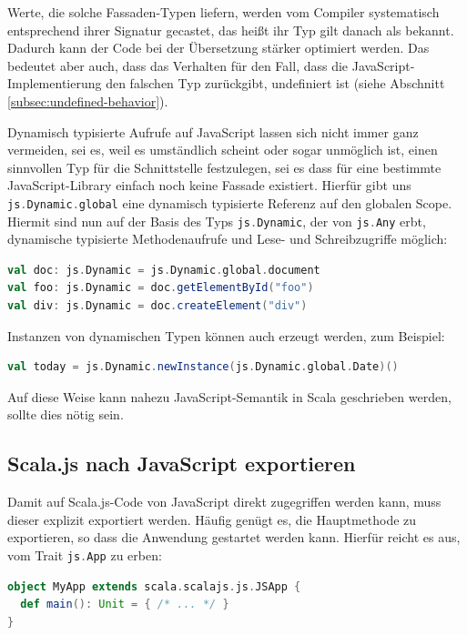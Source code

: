 \documentclass[a4paper, 12pt, hidelinks, listof=totoc, listoftables=totoc, bibliography=totoc]{scrreprt}
\newcommand{\scala}[1]{\lstinline[language=Scala, style=inline]|#1|}
\begin{document}
Werte, die solche Fassaden-Typen liefern, werden vom Compiler systematisch entsprechend ihrer Signatur gecastet, das heißt ihr Typ gilt danach als bekannt. Dadurch kann der Code bei der Übersetzung stärker optimiert werden. Das bedeutet aber auch, dass das Verhalten für den Fall, dass die JavaScript-Implementierung den falschen Typ zurückgibt, undefiniert ist
(siehe Abschnitt \ref{subsec:undefined-behavior}).\cite[Folie 40, Min. 33]{doeraene2015.SSP}

Dynamisch typisierte Aufrufe auf JavaScript lassen sich nicht immer ganz vermeiden, sei es, weil es umständlich scheint oder sogar unmöglich ist, einen sinnvollen Typ für die Schnittstelle festzulegen, sei es dass für eine bestimmte JavaScript-Library einfach noch keine Fassade existiert. Hierfür gibt uns \scala{js.Dynamic.global} eine dynamisch typisierte Referenz auf den globalen Scope. Hiermit sind nun auf der Basis des Typs \scala{js.Dynamic}, der von \scala{js.Any} erbt, dynamische typisierte Methodenaufrufe und Lese- und Schreibzugriffe möglich:

\begin{lstlisting}[language=Scala, style=snippet]
val doc: js.Dynamic = js.Dynamic.global.document
val foo: js.Dynamic = doc.getElementById("foo")
val div: js.Dynamic = doc.createElement("div")
\end{lstlisting}

Instanzen von dynamischen Typen können auch erzeugt werden, zum Beispiel:
\begin{lstlisting}[language=Scala, style=snippet]
val today = js.Dynamic.newInstance(js.Dynamic.global.Date)()
\end{lstlisting}

Auf diese Weise kann nahezu JavaScript-Semantik in Scala geschrieben werden, sollte dies nötig sein.\cite[Vgl.][]{scalajs.DCJ}

\subsection{Scala.js nach JavaScript exportieren}

Damit auf Scala.js-Code von JavaScript direkt zugegriffen werden kann, muss dieser explizit exportiert werden. Häufig genügt es, die Hauptmethode zu exportieren, so dass die Anwendung gestartet werden kann. Hierfür reicht es aus, vom Trait \scala{js.App} zu erben:

\begin{lstlisting}[language=Scala, style=snippet]
object MyApp extends scala.scalajs.js.JSApp {
  def main(): Unit = { /* ... */ }
}
\end{lstlisting}
\end{document}
